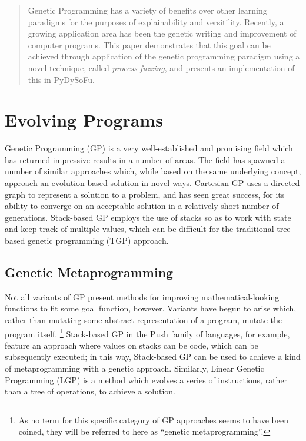 \documentclass[draft,12pt]{llncs}   %
\begin{document}
\maketitle

\begin{abstract}
  Genetic Programming has a variety of benefits over other learning paradigms
  for the purposes of explainability and versitility. Recently, a growing
  application area has been the genetic writing and improvement of computer
  programs. This paper demonstrates that this goal can be achieved through
  application of the genetic programming paradigm using a novel technique,
  called \emph{process fuzzing}, and presents an implementation of this in
  PyDySoFu.
\end{abstract}


\section{Evolving Programs}
Genetic Programming (GP) is a very well-established and promising field which
has returned impressive results in a number of areas. The field has spawned a
number of similar approaches which, while based on the same underlying concept,
approach an evolution-based solution in novel ways. Cartesian
GP\cite{miller2011cartesian} uses a directed graph to
represent a solution to a problem, and has seen great success, for its ability
to converge on an acceptable solution in a relatively short number of
generations. Stack-based GP\cite{perkis1994stack} employs the use of stacks so
as to work with state and keep track of multiple values, which can be difficult
for the traditional tree-based genetic programming (TGP) approach.\par

\subsection{Genetic Metaprogramming}
Not all variants of GP present methods for improving mathematical-looking
functions to fit some goal function, however. Variants have begun to arise
which, rather than mutating some abstract representation of a program, mutate
the program itself. \footnote{As no term for this specific category of GP
  approaches seems to have been coined, they will be referred to here as
  ``genetic metaprogramming''.} Stack-based GP in the Push family of
languages\cite{spector2001autoconstructive}, for example, feature an approach
where values on stacks can be code, which can be subsequently executed; in this
way, Stack-based GP can be used to achieve a kind of metaprogramming with a
genetic approach. Similarly, Linear Genetic Programming\cite{brameier2007linear}
(LGP) is a method which evolves a series of instructions, rather than a tree of
operations, to achieve a solution.\par
\end{document}

